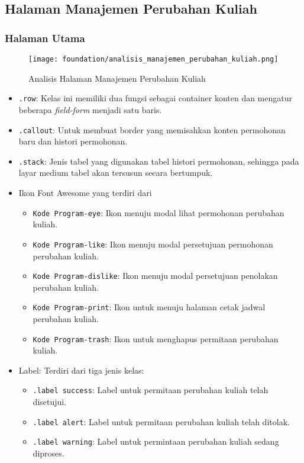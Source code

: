 \subsection{Halaman Manajemen Perubahan Kuliah}
\subsubsection{Halaman Utama}
\begin{figure} [H]
\centering  
\texttt{[image: foundation/analisis\_manajemen\_perubahan\_kuliah.png]}
\caption{Analisis Halaman Manajemen Perubahan Kuliah}
\end{figure}
\begin{itemize}
	\item \texttt{.row}: Kelas ini memiliki dua fungsi sebagai container konten dan mengatur beberapa \textit{field-form} menjadi satu baris. 
	\item \texttt{.callout}: Untuk membuat border yang memisahkan konten permohonan baru dan histori permohonan.
	\item \texttt{.stack}: Jenis tabel yang digunakan tabel histori permohonan, sehingga pada layar medium tabel akan tersusun secara bertumpuk.
	\item Ikon Font Awesome yang terdiri dari 
	\begin{itemize}
		\item \texttt{Kode Program-eye}: Ikon menuju modal lihat permohonan perubahan kuliah.
		\item \texttt{Kode Program-like}: Ikon menuju modal persetujuan permohonan perubahan kuliah.
		\item \texttt{Kode Program-dislike}: Ikon menuju modal persetujuan penolakan perubahan kuliah.
		\item \texttt{Kode Program-print}: Ikon untuk menuju halaman cetak jadwal perubahan kuliah.
		\item \texttt{Kode Program-trash}: Ikon untuk menghapus permitaan perubahan kuliah.
	\end{itemize}
	\item Label: Terdiri dari tiga jenis kelas:
	\begin{itemize}
		\item \texttt{.label success}: Label untuk permitaan perubahan kuliah telah disetujui.
		\item \texttt{.label alert}:  Label untuk permitaan perubahan kuliah telah ditolak.
		\item \texttt{.label warning}: Label untuk permintaan perubahan kuliah sedang diproses.
	\end{itemize}
	
\end{itemize}
